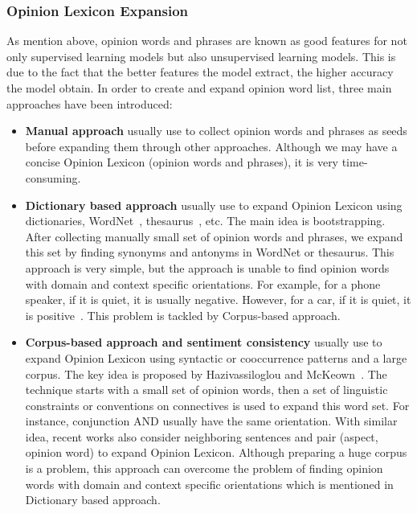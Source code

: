 \documentclass{article}
\begin{document}
\subsubsection{Opinion Lexicon Expansion}
As mention above, opinion words and phrases are known as good features for not only supervised learning models but also unsupervised learning models.
This is due to the fact that the better features the model extract, the higher accuracy the model obtain.
In order to create and expand opinion word list, three main approaches have been introduced:
\begin{itemize}
    \item \textbf{Manual approach} usually use to collect opinion words and phrases as seeds before expanding them through other approaches. Although we may have a concise Opinion Lexicon (opinion words and phrases), it is very time-consuming.
    \item \textbf{Dictionary based approach} usually use to expand Opinion Lexicon using dictionaries, WordNet~\cite{Miller90wordnet:an}, thesaurus~\cite{Mohammad:2009:GHS:1699571.1699591}, etc.
         The main idea is bootstrapping. 
         After collecting manually small set of opinion words and phrases, we expand this set by finding synonyms and antonyms in WordNet or thesaurus. 
         This approach is very simple, but the approach is unable to find opinion words with domain and context specific orientations. For example, for a  phone speaker, if it is quiet, it is usually negative. 
         However, for a car, if it is quiet, it is positive~\cite{Liu2012}. This problem is tackled by Corpus-based approach.
    \item \textbf{Corpus-based approach and sentiment consistency} usually use to expand Opinion Lexicon using syntactic or cooccurrence patterns and a large corpus. 
        The key idea is proposed by Hazivassiloglou and McKeown~\cite{Hatzivassiloglou:1997:PSO:976909.979640}. 
        The technique starts with a small set of opinion words, then a set of linguistic constraints or conventions on connectives is used to expand this word set. 
        For instance, conjunction AND usually have the same orientation. 
        With similar idea, recent works also consider neighboring sentences and pair (aspect, opinion word) to expand Opinion Lexicon. 
        Although preparing a huge corpus is a problem, this approach can overcome the problem of finding opinion words with domain and context specific orientations which is mentioned in Dictionary based approach.
\end{itemize}
\end{document}

